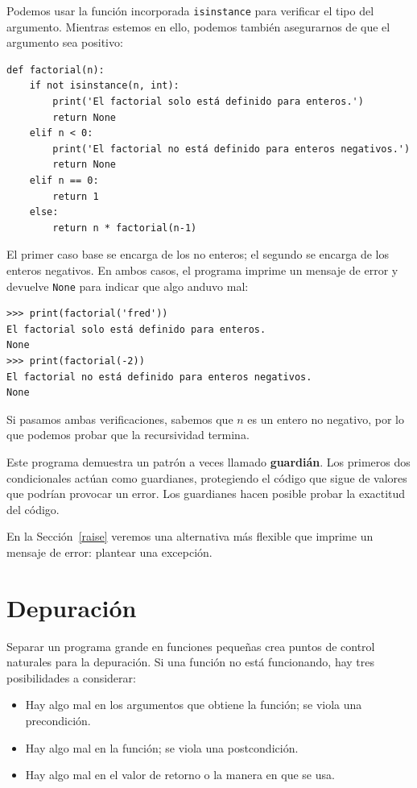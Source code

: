 \documentclass[10pt]{book}
\begin{document}
Podemos usar la función incorporada {\tt isinstance} para verificar el tipo
del argumento.  Mientras estemos en ello, podemos también asegurarnos de que el
argumento sea positivo:

\begin{verbatim}
def factorial(n):
    if not isinstance(n, int):
        print('El factorial solo está definido para enteros.')
        return None
    elif n < 0:
        print('El factorial no está definido para enteros negativos.')
        return None
    elif n == 0:
        return 1
    else:
        return n * factorial(n-1)
\end{verbatim}
%
El primer caso base se encarga de los no enteros; el
segundo se  encarga de los enteros negativos.  En ambos casos, el programa imprime
un mensaje de error y devuelve {\tt None} para indicar que algo
anduvo mal:

\begin{verbatim}
>>> print(factorial('fred'))
El factorial solo está definido para enteros.
None
>>> print(factorial(-2))
El factorial no está definido para enteros negativos.
None
\end{verbatim}
%
Si pasamos ambas verificaciones, sabemos que $n$ es un entero no negativo, por lo que podemos probar que la recursividad termina.

Este programa demuestra un patrón a veces llamado {\bf guardián}.
Los primeros dos condicionales actúan como guardianes, protegiendo el código que
sigue de valores que podrían provocar un error.  Los guardianes hacen
posible probar la exactitud del código.

En la Sección~\ref{raise} veremos una alternativa más flexible que imprime
un mensaje de error: plantear una excepción.


\section{Depuración}
\label{factdebug}

Separar un programa grande en funciones pequeñas crea puntos de control
naturales para la depuración.  Si una función no está
funcionando, hay tres posibilidades a considerar:

\begin{itemize}

\item Hay algo mal en los argumentos que obtiene
la función; se viola una precondición.

\item Hay algo mal en la función; se viola una
postcondición.

\item Hay algo mal en el valor de retorno o la
manera en que se usa.

\end{itemize}
\end{document}
